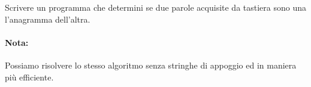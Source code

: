 \begin{Exercise}[label={ex:anagramma}]
  Scrivere un programma che determini se due parole acquisite da tastiera sono una l'anagramma dell'altra.
\end{Exercise}


\begin{Answer}[ref={ex:anagramma}]
		
        \paragraph{Nota: } Possiamo risolvere lo stesso algoritmo senza stringhe di appoggio ed in maniera più efficiente.
		
\end{Answer}